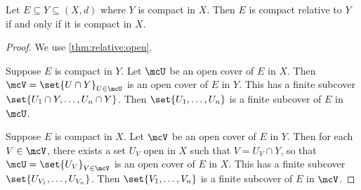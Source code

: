 \begin{theorem} \label{thm:relative:compact}
    Let $E \subseteq Y \subseteq (X, d)$ where $Y$ is compact in $X$.
    Then $E$ is compact relative to $Y$ if and only if it is compact in $X$.
\end{theorem}
\begin{proof}
    We use \cref{thm:relative:open}.

    Suppose $E$ is compact in $Y$.
    Let $\mcU$ be an open cover of $E$ in $X$.
    Then $\mcV = \set{U \cap Y}_{U \in \mcU}$ is an open cover of $E$
    in $Y$.
    This has a finite subcover $\set{U_1 \cap Y, \dots, U_n \cap Y}$.
    Then $\set{U_1, \dots, U_n}$ is a finite subcover of $E$ in $\mcU$.

    Suppose $E$ is compact in $X$.
    Let $\mcV$ be an open cover of $E$ in $Y$.
    Then for each $V \in \mcV$,
    there exists a set $U_V$ open in $X$ such that $V = U_V \cap Y$,
    so that $\mcU = \set{U_V}_{V \in \mcV}$ is an open cover of $E$ in $X$.
    This has a finite subcover $\set{U_{V_1}, \dots, U_{V_n}}$.
    Then $\set{V_1, \dots, V_n}$ is a finite subcover of $E$ in $\mcV$.
\end{proof}
